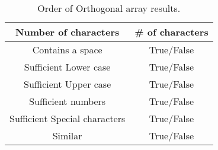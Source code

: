 \documentclass[12pt,letterpaper]{article}
\begin{document}
\begin{table}[h!]
  \begin{center}
    \caption{Order of Orthogonal array results.}
    \label{tab:table1}
    
    \begin{tabular}{||c|c||}
    \hline
	Number of characters & \# of characters \\
	\hline
	Contains a space & True/False \\
	\hline
	Sufficient Lower case & True/False \\
	\hline
	Sufficient Upper case& True/False \\
	\hline
	Sufficient numbers & True/False \\
	\hline
	Sufficient Special characters & True/False \\
	Similar & True/False \\
    \hline
    \end{tabular}
  \end{center}
\end{table}
\end{document}
